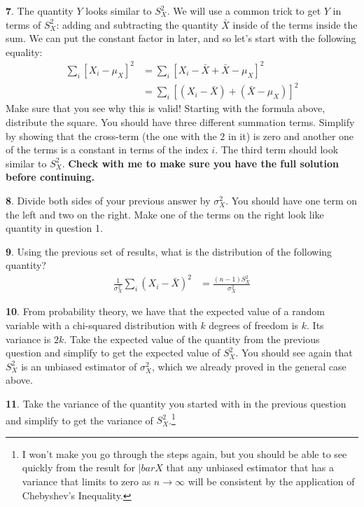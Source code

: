 \documentclass{tufte-handout}
\begin{document}
\textbf{7}. The quantity $Y$ looks similar to $S_X^2$. We will use a common trick to
get $Y$ in terms of $S_X^2$: adding and subtracting the quantity $\bar{X}$
inside of the terms inside the sum. We can put the constant factor in later,
and so let's start with the following equality:
\begin{align*}
\sum_i \left[ X_i - \mu_X \right]^2 &= \sum_i \left[ X_i - \bar{X} + \bar{X} - \mu_X \right]^2  \\
&= \sum_i \left[ (X_i - \bar{X}) + (\bar{X} - \mu_X) \right]^2 
\end{align*}
Make sure that you see why this is valid! Starting with the
formula above, distribute the square. You should have three different summation
terms. Simplify by showing that the cross-term (the one with the $2$ in it) is
zero and another one of the terms is a constant in terms of the index $i$. The
third term should look similar to $S_X^2$. \textbf{Check with me to make sure
you have the full solution before continuing.}

\textbf{8}. Divide both sides of your previous answer by $\sigma_X^2$. You
should have one term on the left and two on the right. Make one of the terms
on the right look like quantity in question 1.

\textbf{9}. Using the previous set of results, what is the distribution of
the following quantity?
\begin{align*}
\frac{1}{\sigma_X^2} \sum_i (X_i - \bar{X})^2 &= \frac{(n-1) S_X^2}{\sigma_X^2}
\end{align*}

\textbf{10}. From probability theory, we have that the expected value of a random variable with
a chi-squared distribution with $k$ degrees of freedom is $k$. Its variance is $2k$.
Take the expected value of the quantity from the previous question and
simplify to get the expected value of $S_X^2$. You should see again that $S_X^2$ is
an unbiased estimator of $\sigma_X^2$, which we already proved in the general case
above.

\textbf{11}. Take the variance of the quantity you started with in the previous question and
simplify to get the variance of $S_X^2$.\footnote{
  I won't make you go through the steps again, but you should be able to see
  quickly from the result for $|bar{X}$ that any unbiased estimator that has
  a variance that limits to zero as $n\rightarrow\infty$ will be consistent
  by the application of Chebyshev's Inequality.
}
\end{document}
